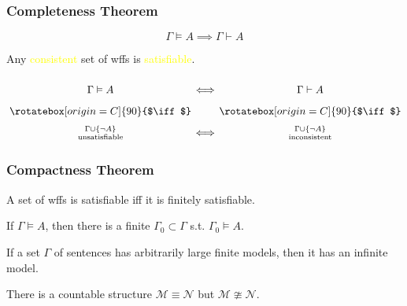 \documentclass[UTF8,aspectratio=43,11pt,colorlinks,compress,openany]{beamer}%
\begin{document}
\begin{frame}\frametitle{Completeness Theorem}
		\begin{theorem}
			\[\Gamma\vDash A\implies\Gamma\vdash A\]
		\end{theorem}
		\begin{corollary}
			Any \textcolor{yellow}{consistent} set of wffs is \textcolor{yellow}{satisfiable}.
		\end{corollary}\vspace*{-3ex}
		{\Large \[\arraycolsep=0.7pt\def\arraystretch{1.7}
			\begin{array}{cccc}
			&\Gamma\vDash A&\iff&\Gamma\vdash A\\
			&\rotatebox[origin=C]{90}{$\iff$}&&\rotatebox[origin=C]{90}{$\iff$}\\
			&\Gamma\cup\{\neg A\}\atop{\text{unsatisfiable}}&\iff&\Gamma\cup\{\neg A\}\atop{\text{inconsistent}}
			\end{array}
			\]}
\end{frame}

\begin{frame}\frametitle{Compactness Theorem}
	\begin{theorem}
		A set of wffs is satisfiable iff it is finitely satisfiable.
	\end{theorem}
	\begin{corollary}
		If $\Gamma\vDash A$, then there is a finite $\Gamma_0\subset\Gamma$ s.t. $\Gamma_0\vDash A$.
	\end{corollary}
	\begin{corollary}
		If a set $\Gamma$ of sentences has arbitrarily large finite models, then it has an infinite model.
	\end{corollary}
	\begin{corollary}
		There is a countable structure $\mathcal{M}\equiv\mathcal{N}$ but $\mathcal{M}\ncong\mathcal{N}$.
	\end{corollary}
\end{frame}
\end{document}
